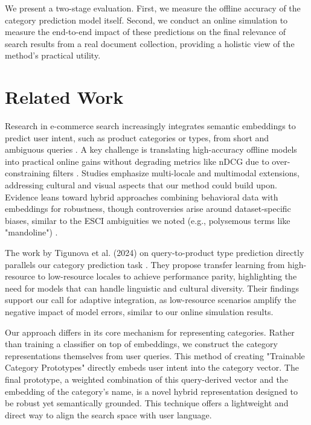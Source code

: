 \documentclass[12pt, a4paper]{article}
\begin{document}
We present a two-stage evaluation. First, we measure the offline accuracy of the category prediction model itself. Second, we conduct an online simulation to measure the end-to-end impact of these predictions on the final relevance of search results from a real document collection, providing a holistic view of the method's practical utility.

\section{Related Work}

Research in e-commerce search increasingly integrates semantic embeddings to predict user intent, such as product categories or types, from short and ambiguous queries \cite{tigunova2024transfer}. A key challenge is translating high-accuracy offline models into practical online gains without degrading metrics like nDCG due to over-constraining filters \cite{vasilev2024mind}. Studies emphasize multi-locale and multimodal extensions, addressing cultural and visual aspects that our method could build upon. Evidence leans toward hybrid approaches combining behavioral data with embeddings for robustness, though controversies arise around dataset-specific biases, similar to the ESCI ambiguities we noted (e.g., polysemous terms like "mandoline") \cite{rakesh2023query}.

The work by Tigunova et al. (2024) on query-to-product type prediction directly parallels our category prediction task \cite{tigunova2024transfer}. They propose transfer learning from high-resource to low-resource locales to achieve performance parity, highlighting the need for models that can handle linguistic and cultural diversity. Their findings support our call for adaptive integration, as low-resource scenarios amplify the negative impact of model errors, similar to our online simulation results.

Our approach differs in its core mechanism for representing categories. Rather than training a classifier on top of embeddings, we construct the category representations themselves from user queries. This method of creating "Trainable Category Prototypes" directly embeds user intent into the category vector. The final prototype, a weighted combination of this query-derived vector and the embedding of the category's name, is a novel hybrid representation designed to be robust yet semantically grounded. This technique offers a lightweight and direct way to align the search space with user language.
\end{document}
